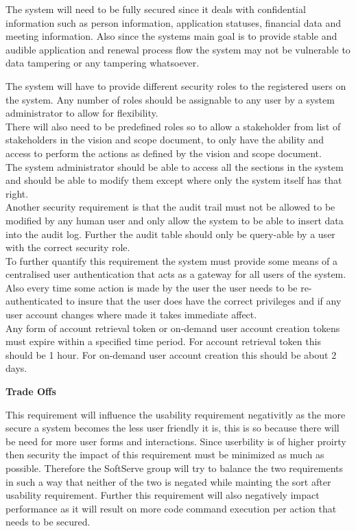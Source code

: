 \begin{flushleft}

The system will need to be fully secured since it deals with confidential information such as person information, application statuses, financial data and meeting information. Also since the systems main goal is to provide stable and audible application and renewal process flow the system may not be vulnerable to data tampering or any tampering whatsoever.\\
\vspace{0.1in}

The system will have to provide different security roles to the registered users on the system. Any number of roles should be assignable to any user by a system administrator to allow for flexibility.\\
There will also need to be predefined roles so to allow a stakeholder from list of stakeholders in the vision and scope document, to only have the ability and access to perform the actions as defined by the vision and scope document.\\
The system administrator should be able to access all the sections in the system and should be able to modify them except where only the system itself has that right.\\
Another security requirement is that the audit trail must not be allowed to be modified by any human user and only allow the system to be able to insert data into the audit log. Further the audit table should only be query-able by a user with the correct security role.\\
To further quantify this requirement the system must provide some means of a centralised user authentication that acts as a gateway for all users of the system. Also every time some action is made by the user the user needs to be re-authenticated to insure that the user does have the correct privileges and if any user account changes where made it takes immediate affect. \\
Any form of account retrieval token or on-demand user account creation tokens must expire within a specified time period. For account retrieval token this should be 1 hour. For on-demand user account creation this should be about 2 days.
\vspace{0.1in}

\textbf{Trade Offs}

This requirement will influence the usability requirement negativitly as  the more secure a system becomes the less user friendly it is, this is so because there will be need for more user forms and interactions. Since userbility is of higher proirty then security the impact of this requirement must be minimized as much as possible. Therefore the SoftServe group will try to balance the two requirements in such a way that neither of the two is negated while mainting the sort after usability requirement. Further this requirement will also negatively impact performance as it will result on more code command execution per action that needs to be secured.
\end{flushleft}

